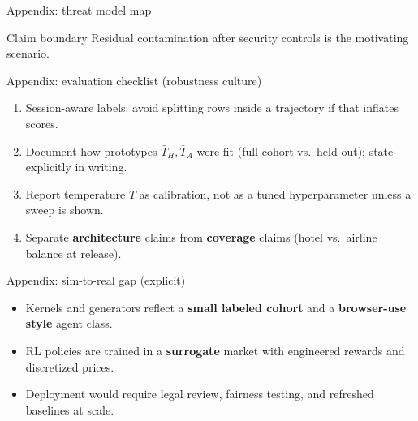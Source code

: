 \begin{frame}{Appendix: threat model map}
  \centering
  \vfill
  \begin{block}{Claim boundary}
    Residual contamination after security controls is the motivating scenario.
  \end{block}
\end{frame}

\begin{frame}{Appendix: evaluation checklist (robustness culture)}
  \footnotesize
  \begin{enumerate}
    \item Session-aware labels: avoid splitting rows inside a trajectory if that inflates scores.
    \item Document how prototypes \(\bar{T}_H,\bar{T}_A\) were fit (full cohort vs.\ held-out); state explicitly in writing.
    \item Report temperature \(T\) as calibration, not as a tuned hyperparameter unless a sweep is shown.
    \item Separate \textbf{architecture} claims from \textbf{coverage} claims (hotel vs.\ airline balance at release).
  \end{enumerate}
\end{frame}

\begin{frame}{Appendix: sim-to-real gap (explicit)}
  \begin{itemize}
    \item Kernels and generators reflect a \textbf{small labeled cohort} and a \textbf{browser-use style} agent class.
    \item RL policies are trained in a \textbf{surrogate} market with engineered rewards and discretized prices.
    \item Deployment would require legal review, fairness testing, and refreshed baselines at scale.
  \end{itemize}
\end{frame}

